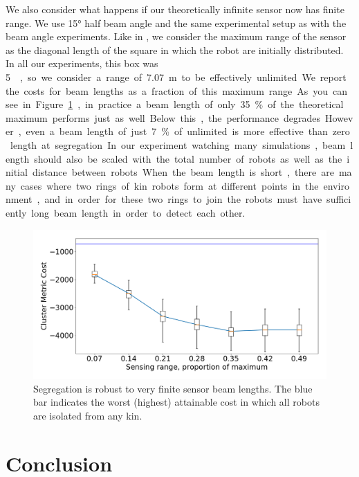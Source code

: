 \documentclass[conference]{IEEEtran}
\begin{document}
    We also consider what happens if our theoretically infinite sensor now has finite range. We use \ang{15} half beam angle and the same experimental setup as with the beam angle experiments. Like in \cite{gauci_self-organized_2014}, we consider the maximum range of the sensor as the diagonal length of the square in which the robot are initially distributed. In all our experiments, this box was \SI{5}{\meter\square}, so we consider a range of \SI{7.07}{\meter} to be effectively unlimited. We report the costs for beam lengths as a fraction of this maximum range. As you can see in Figure \ref{fig:beam_length}, in practice a beam length of only 35\% of the theoretical maximum performs just as well. Below this, the performance degrades. However, even a beam length of just 7\% of unlimited is more effective than zero length at segregation. In our experiment watching many simulations, beam length should also be scaled with the total number of robots as well as the initial distance between robots. When the beam length is short, there are many cases where two rings of kin robots form at different points in the environment, and in order for these two rings to join the robots must have sufficiently long beam length in order to detect each other.

    \begin{figure}
      \centering
      \includegraphics[width=1\linewidth]{./images/beam_length.png}
      \caption{Segregation is robust to very finite sensor beam lengths. The blue bar indicates the worst (highest) attainable cost in which all robots are isolated from any kin.}
      \label{fig:beam_length}
    \end{figure}

\section{Conclusion}
\end{document}
